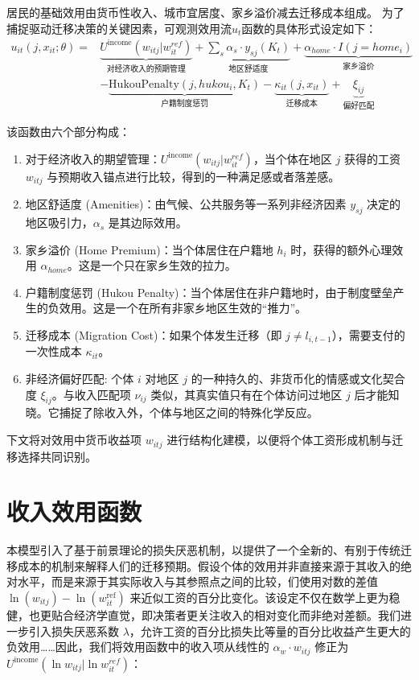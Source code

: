 \documentclass[
  a4paper,
  zihao=-4,
  fontset=mac,
  AutoFakeBold,
  AutoFakeSlant,
  oneside]{ctexbook}
\begin{document}
居民的基础效用由货币性收入、城市宜居度、家乡溢价减去迁移成本组成。
为了捕捉驱动迁移决策的关键因素，可观测效用流$u_t$函数的具体形式设定如下：
\begin{equation}
\begin{split}
     u_{it}(j, x_{it}; \theta) = & \underbrace{ U^{\text{income}}(w_{itj} | w_{it}^{ref}) }_{\text{对经济收入的预期管理}} + \underbrace{\sum_s \alpha_s \cdot y_{sj}(K_t)}_{\text{地区舒适度}} + \underbrace{\alpha_{home} \cdot I(j=home_i)}_{\text{家乡溢价}} \\
    & - \underbrace{\text{HukouPenalty}(j, hukou_i, K_t)}_{\text{户籍制度惩罚}} - \underbrace{\kappa_{it}(j, x_{it})}_{\text{迁移成本}} + \underbrace{\xi_{ij}}_{\text{偏好匹配}}
\end{split}
\label{eq:确定性效用函数}
\end{equation}


该函数由六个部分构成：
\begin{enumerate}
  \item 对于经济收入的期望管理：$U^{\text{income}}(w_{itj} | w_{it}^{ref})$，当个体在地区 $j$ 获得的工资 $w_{itj}$ 与预期收入锚点进行比较，得到的一种满足感或者落差感。
  \item 地区舒适度 (Amenities)：由气候、公共服务等一系列非经济因素 $y_{sj}$ 决定的地区吸引力，$\alpha_s$ 是其边际效用。
  \item 家乡溢价 (Home Premium)：当个体居住在户籍地 $h_i$ 时，获得的额外心理效用 $\alpha_{home}$。这是一个只在家乡生效的拉力。
  \item 户籍制度惩罚 (Hukou Penalty)：当个体居住在非户籍地时，由于制度壁垒产生的负效用。这是一个在所有非家乡地区生效的“推力”。
  \item 迁移成本 (Migration Cost)：如果个体发生迁移（即 $j \neq l_{i,t-1}$），需要支付的一次性成本 $\kappa_{it}$。
  \item 非经济偏好匹配: 个体 $i$ 对地区 $j$ 的一种持久的、非货币化的情感或文化契合度 $\xi_{ij}$。与收入匹配项 $\nu_{ij}$ 类似，其真实值只有在个体访问过地区 $j$ 后才能知晓。它捕捉了除收入外，个体与地区之间的特殊化学反应。
\end{enumerate}

下文将对效用中货币收益项 $w_{itj}$ 进行结构化建模，以便将个体工资形成机制与迁移选择共同识别。

\section{收入效用函数}

本模型引入了基于前景理论的损失厌恶机制，以提供了一个全新的、有别于传统迁移成本的机制来解释人们的迁移预期。假设个体的效用并非直接来源于其收入的绝对水平，而是来源于其实际收入与其参照点之间的比较，们使用对数的差值 $\ln(w_{itj}) - \ln(w_{it}^{\text{ref}})$ 来近似工资的百分比变化。该设定不仅在数学上更为稳健，也更贴合经济学直觉，即决策者更关注收入的相对变化而非绝对差额。我们进一步引入损失厌恶系数 $\lambda$，允许工资的百分比损失比等量的百分比收益产生更大的负效用……因此，我们将效用函数中的收入项从线性的 $α_w \cdot w_{itj}$ 修正为 $U^{\text{income}}(\ln w_{itj} | \ln w_{it}^{ref})$：
\end{document}
